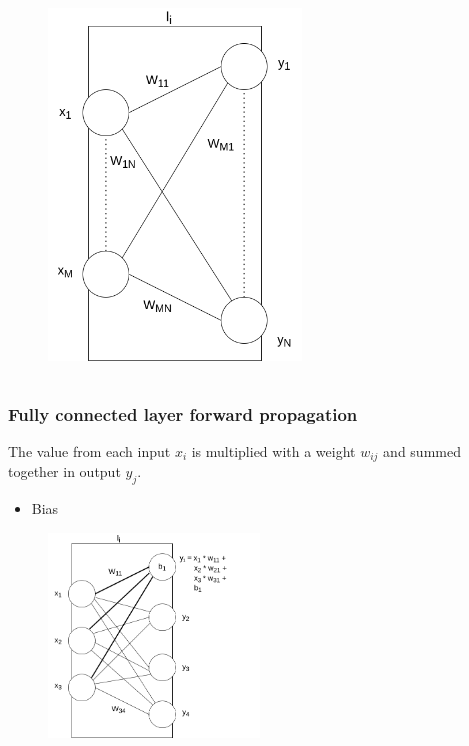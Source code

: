 \documentclass{beamer}
\begin{document}
\begin{frame}
\begin{columns}
\begin{column}{0.5\textwidth}
\begin{figure}
                \includegraphics[width=0.6\textwidth]{../assets/linear-layer.png}
            \end{figure}
        \end{column}
    \end{columns}
\end{frame}

\begin{frame}
    \frametitle{Fully connected layer forward propagation}
    The value from each input $x_i$ is multiplied with a weight $w_{ij}$ and summed together in output $y_j$.
    \begin{itemize}
        \item Bias
    \end{itemize}

    \begin{figure}
        \centering
        \includegraphics[width=0.5\textwidth]{../assets/linear-layer-linear-propagation.drawio.png}
    \end{figure}
\end{frame}
\end{document}
